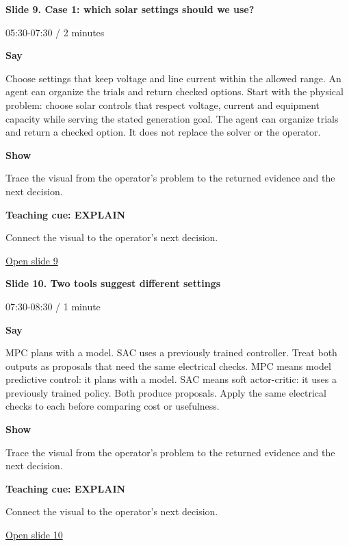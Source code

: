 \documentclass[12pt,letterpaper]{article}
\begin{document}
\clearpage{}
{\Large\bfseries\color{IEEEBlue} Slide 9. Case 1: which solar settings should we use?\par}\medskip
{\small\color{Slate} 05:30-07:30 /\allowbreak{} 2 minutes\par}\medskip
\textbf{Say}\par Choose settings that keep voltage and line current within the allowed range. An agent can organize the trials and return checked options. Start with the physical problem: choose solar controls that respect voltage, current and equipment capacity while serving the stated generation goal. The agent can organize trials and return a checked option. It does not replace the solver or the operator.\par\medskip
\textbf{Show}\par Trace the visual from the operator's problem to the returned evidence and the next decision.\par\medskip
\textbf{Teaching cue: EXPLAIN}\par Connect the visual to the operator's next decision.\par\medskip
\vfill\href{https://alaaselim-sudo.github.io/GridGuard-Agentic-AI-Tutorials/operator-cases/#/9}{Open slide 9}\par
\clearpage{}
{\Large\bfseries\color{IEEEBlue} Slide 10. Two tools suggest different settings\par}\medskip
{\small\color{Slate} 07:30-08:30 /\allowbreak{} 1 minute\par}\medskip
\textbf{Say}\par MPC plans with a model. SAC uses a previously trained controller. Treat both outputs as proposals that need the same electrical checks. MPC means model predictive control: it plans with a model. SAC means soft actor-critic: it uses a previously trained policy. Both produce proposals. Apply the same electrical checks to each before comparing cost or usefulness.\par\medskip
\textbf{Show}\par Trace the visual from the operator's problem to the returned evidence and the next decision.\par\medskip
\textbf{Teaching cue: EXPLAIN}\par Connect the visual to the operator's next decision.\par\medskip
\vfill\href{https://alaaselim-sudo.github.io/GridGuard-Agentic-AI-Tutorials/operator-cases/#/10}{Open slide 10}\par
\end{document}
